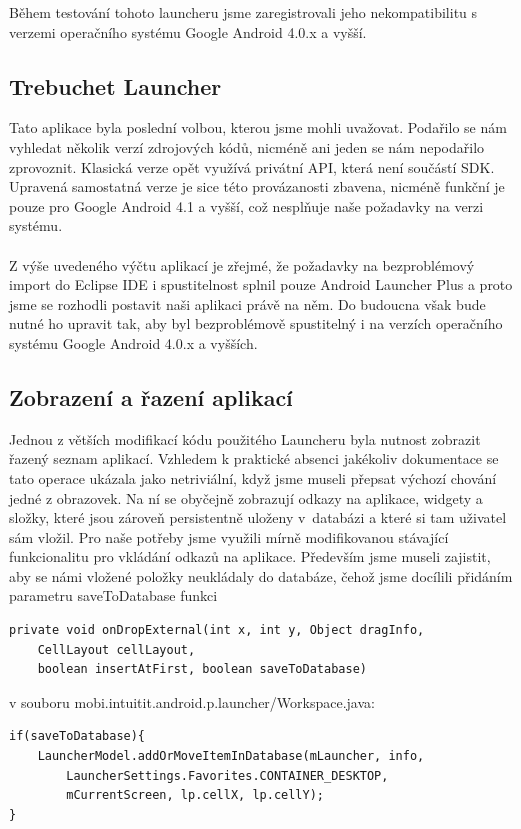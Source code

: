 \documentclass[thesis=M,czech]{FITthesis}[2012/06/26]
\begin{document}
Během testování tohoto launcheru jsme zaregistrovali jeho nekompatibilitu s verzemi operačního systému Google Android 4.0.x a vyšší.

\subsection{Trebuchet Launcher}
Tato aplikace byla poslední volbou, kterou jsme mohli uvažovat. Podařilo se nám vyhledat několik verzí zdrojových kódů, nicméně ani jeden se nám nepodařilo zprovoznit. Klasická verze opět využívá privátní API, která není součástí SDK. Upravená samostatná verze je sice této provázanosti zbavena, nicméně funkční je pouze pro Google Android 4.1 a vyšší, což nesplňuje naše požadavky na verzi systému.
\\\\
Z výše uvedeného výčtu aplikací je zřejmé, že požadavky na bezproblémový import do Eclipse IDE i spustitelnost splnil pouze Android Launcher Plus a proto jsme se rozhodli postavit naši aplikaci právě na něm. Do budoucna však bude nutné ho upravit tak, aby byl bezproblémově spustitelný i na verzích operačního systému Google Android 4.0.x a vyšších.

\subsection{Zobrazení a řazení aplikací}
Jednou z větších modifikací kódu použitého Launcheru byla nutnost zobrazit řazený seznam aplikací. Vzhledem k praktické absenci jakékoliv dokumentace se tato operace ukázala jako netriviální, když jsme museli přepsat výchozí chování jedné z obrazovek. Na ní se obyčejně zobrazují odkazy na aplikace, widgety a složky, které jsou zároveň persistentně uloženy v~databázi a které si tam uživatel sám vložil. Pro naše potřeby jsme využili mírně modifikovanou stávající funkcionalitu pro vkládání odkazů na aplikace. Především jsme museli zajistit, aby se námi vložené položky neukládaly do databáze, čehož jsme docílili přidáním parametru saveToDatabase funkci

\begin{verbatim}
private void onDropExternal(int x, int y, Object dragInfo, 
    CellLayout cellLayout,
    boolean insertAtFirst, boolean saveToDatabase)
\end{verbatim}
v souboru mobi.intuitit.android.p.launcher/Workspace.java:

\begin{verbatim}
if(saveToDatabase){
    LauncherModel.addOrMoveItemInDatabase(mLauncher, info,
        LauncherSettings.Favorites.CONTAINER_DESKTOP, 
        mCurrentScreen, lp.cellX, lp.cellY);
}
\end{verbatim}
\end{document}
